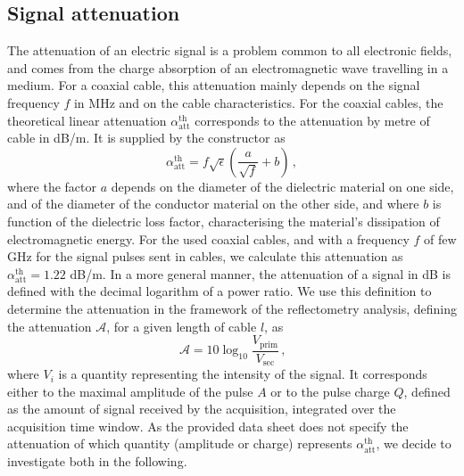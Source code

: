 \subsection{Signal attenuation}
\label{subsec:attenuation}
The attenuation of an electric signal is a problem common to all electronic fields, and comes from the charge absorption of an electromagnetic wave travelling in a medium.
For a coaxial cable, this attenuation mainly depends on the signal frequency $f$ in MHz and on the cable characteristics.
For the coaxial cables, the theoretical linear attenuation $\alpha_{\text{att}}^{\text{th}}$ corresponds to the attenuation by metre of cable in dB/m.
It is supplied by the constructor as
\begin{equation}
  \alpha_{\text{att}}^{\text{th}} = f\sqrt{\epsilon}(\frac{a}{\sqrt{f}}+b)\,,
\end{equation}
where the factor $a$ depends on the diameter of the dielectric material on one side, and of the diameter of the conductor material on the other side, and where $b$ is function of the dielectric loss factor, characterising the material's dissipation of electromagnetic energy.
For the used coaxial cables, and with a frequency $f$ of few GHz for the signal pulses sent in cables, we calculate this attenuation as $\alpha_{\text{att}}^{\text{th}} = 1.22$ dB/m.
In a more general manner, the attenuation of a signal in dB is defined with the decimal logarithm of a power ratio.
We use this definition to determine the attenuation in the framework of the reflectometry analysis, defining the attenuation $\mathcal{A}$, for a given length of cable $l$, as
\begin{equation}
  \mathcal{A}=10\log_{10}\frac{V_{\text{prim}}}{V_{\text{sec}}} \,\text{,}
\end{equation}
where $V_{i}$ is a quantity representing the intensity of the signal.
It corresponds either to the maximal amplitude of the pulse $A$ or to the pulse charge $Q$, defined as the amount of signal received by the acquisition, integrated over the acquisition time window.
As the provided data sheet does not specify the attenuation of which quantity (amplitude or charge) represents $\alpha_{\text{att}}^{\text{th}}$, we decide to investigate both in the following.
